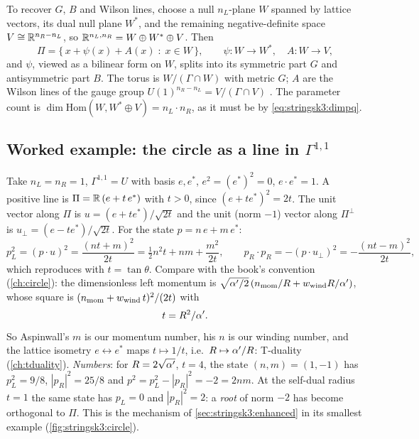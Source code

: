 To recover $G$, $B$ and Wilson lines, choose a null $n_L$-plane $W$ spanned by lattice
vectors, its dual null plane $W^*$, and the remaining negative-definite space
$V\cong\mathbb{R}^{n_R-n_L}$, so $\mathbb{R}^{n_L,n_R}=W\oplus W^*\oplus V$. Then
\begin{equation}\label{eq:stringsk3:graph}
  \Pi=\{\,x+\psi(x)+A(x)\;:\;x\in W\,\},\qquad \psi:W\to W^*,\quad A:W\to V,
\end{equation}
and $\psi$, viewed as a bilinear form on $W$, splits into its symmetric part $G$ and
antisymmetric part $B$. The torus is $W/(\Gamma\cap W)$ with metric $G$; $A$ are the Wilson
lines of the gauge group $U(1)^{n_R-n_L}=V/(\Gamma\cap V)$
. The parameter count is
$\dim\mathrm{Hom}(W,W^*\oplus V)=n_L\cdot n_R$, as it must be by \eqref{eq:stringsk3:dimpq}.

\subsection{Worked example: the circle as a line in \texorpdfstring{$\Gamma^{1,1}$}{Gamma(1,1)}}
\label{sec:stringsk3:circle}
Take $n_L=n_R=1$, $\Gamma^{1,1}=U$ with basis $e,e^*$, $e^2=(e^*)^2=0$, $e\cdot e^*=1$. A
positive line is $\Pi=\mathbb{R}\,(e+t\,e^*)$ with $t>0$, since $(e+te^*)^2=2t$. The unit vector along
$\Pi$ is $u=(e+te^*)/\sqrt{2t}$ and the unit (norm $-1$) vector along $\Pi^\perp$ is
$u_\perp=(e-te^*)/\sqrt{2t}$. For the state $p=n\,e+m\,e^*$:
\begin{equation}\label{eq:stringsk3:circlepLpR}
  p_L^2=(p\cdot u)^2=\frac{(nt+m)^2}{2t}=\tfrac12n^2t+nm+\frac{m^2}{2t},\qquad
  p_R\cdot p_R=-(p\cdot u_\perp)^2=-\frac{(nt-m)^2}{2t},
\end{equation}
which reproduces  with $t=\tan\theta$. Compare
with the book's convention (\cref{ch:circle}): the dimensionless left momentum is
$\sqrt{\alpha'/2}\,(n_{\rm mom}/R+w_{\rm wind}R/\alpha')$, whose square is
$(n_{\rm mom}+w_{\rm wind}\,t)^2/(2t)$ with
\begin{equation}
  t=R^2/\alpha' .
\end{equation}
So Aspinwall's $m$ is our momentum number, his $n$ is our winding number, and the lattice
isometry $e\leftrightarrow e^*$ maps $t\mapsto1/t$, i.e.\ $R\mapsto\alpha'/R$: T-duality
(\cref{ch:tduality}). \emph{Numbers}: for $R=2\sqrt{\alpha'}$, $t=4$, the state $(n,m)=(1,-1)$ has
$p_L^2=9/8$, $|p_R|^2=25/8$ and $p^2=p_L^2-|p_R|^2=-2=2nm$. At the self-dual radius $t=1$ the
same state has $p_L=0$ and $|p_R|^2=2$: a \emph{root} of norm $-2$ has become orthogonal to
$\Pi$. This is the mechanism of \cref{sec:stringsk3:enhanced} in its smallest example
(\cref{fig:stringsk3:circle}).

